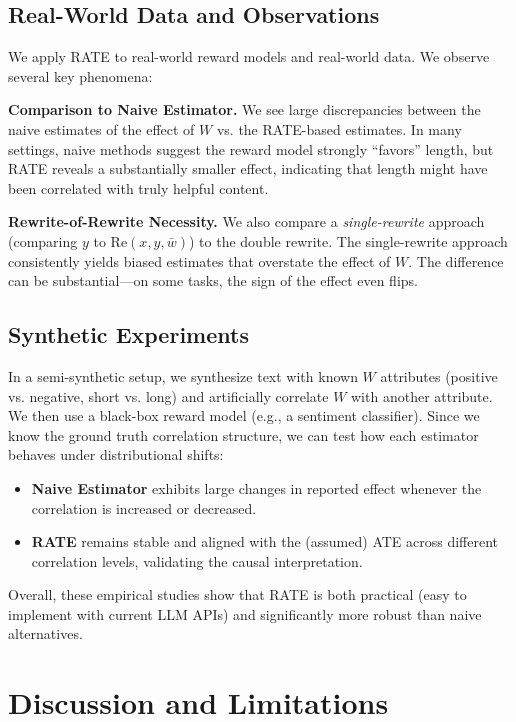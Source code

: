 \documentclass{article}
\theoremstyle{definition}
\begin{document}
\subsection{Real-World Data and Observations}

We apply RATE to real-world reward models and real-world data. We observe several key phenomena:

\textbf{Comparison to Naive Estimator.} We see large discrepancies between the naive estimates of the effect of $W$ vs. the RATE-based estimates. In many settings, naive methods suggest the reward model strongly ``favors'' length, but RATE reveals a substantially smaller effect, indicating that length might have been correlated with truly helpful content.

\textbf{Rewrite-of-Rewrite Necessity.} We also compare a \emph{single-rewrite} approach (comparing $y$ to $\text{Re}(x, y, \bar{w})$) to the double rewrite. The single-rewrite approach consistently yields biased estimates that overstate the effect of $W$. The difference can be substantial---on some tasks, the sign of the effect even flips.

\subsection{Synthetic Experiments}

In a semi-synthetic setup, we synthesize text with known $W$ attributes (positive vs. negative, short vs. long) and artificially correlate $W$ with another attribute. We then use a black-box reward model (e.g., a sentiment classifier). Since we know the ground truth correlation structure, we can test how each estimator behaves under distributional shifts:
\begin{itemize}
    \item \textbf{Naive Estimator} exhibits large changes in reported effect whenever the correlation is increased or decreased.
    \item \textbf{RATE} remains stable and aligned with the (assumed) ATE across different correlation levels, validating the causal interpretation.
\end{itemize}

Overall, these empirical studies show that RATE is both practical (easy to implement with current LLM APIs) and significantly more robust than naive alternatives.

\section{Discussion and Limitations}
\label{sec:discussion}
\end{document}
